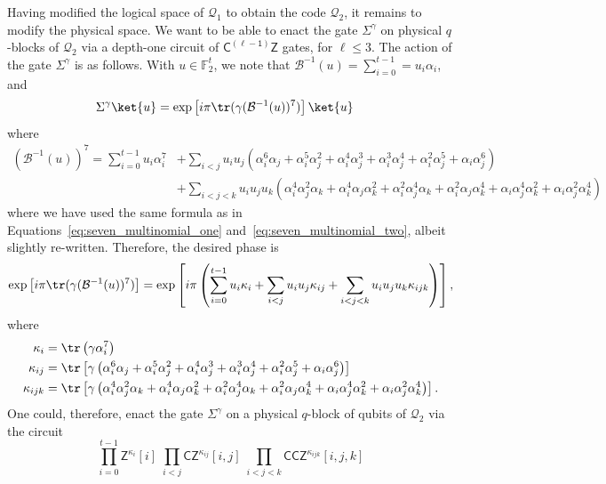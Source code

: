 \documentclass[11pt]{article}
\theoremstyle{definition}
\renewcommand{\leq}{\leqslant}
\newcommand{\CCZ}{\mathsf{CCZ}}
\newcommand{\CLZ}{\mathsf{C^{(\ell-1)}Z}}
\newcommand{\qcode}{\mathcal{Q}}
\begin{document}
Having modified the logical space of $\qcode_1$ to obtain the code $\qcode_2$, it remains to modify the physical space. We want to be able to enact the gate $\Sigma^\gamma$ on physical $q$-blocks of $\qcode_2$ via a depth-one circuit of $\CLZ$ gates, for $\ell \leq 3$. The action of the gate $\Sigma^\gamma$ is as follows. With $u \in \mathbb{F}_2^t$, we note that $\mathcal{B}^{-1}(u) = \sum_{i=0}^{t-1} = u_i\alpha_i$, and
\begin{align}
    \Sigma^\gamma\ket{u} &= \exp\left[i\pi\tr(\gamma(\mathcal{B}^{-1}(u))^7)\right]\ket{u}
\end{align}
where
\begin{align}
    \left(\mathcal{B}^{-1}(u)\right)^7 = \sum_{i=0}^{t-1}u_i\alpha_i^7 &+ \sum_{i < j}u_iu_j\left(\alpha_i^6\alpha_j + \alpha_i^5\alpha_j^2+\alpha_i^4\alpha_j^3+\alpha_i^3\alpha_j^4+\alpha_i^2\alpha_j^5+\alpha_i\alpha_j^6\right)\\
    &+\sum_{i<j<k}u_iu_ju_k\left(\alpha_i^4\alpha_j^2\alpha_k+\alpha_i^4\alpha_j\alpha_k^2+\alpha_i^2\alpha_j^4\alpha_k+\alpha_i^2\alpha_j\alpha_k^4+\alpha_i\alpha_j^4\alpha_k^2+\alpha_i\alpha_j^2\alpha_k^4\right)
\end{align}
where we have used the same formula as in Equations~\eqref{eq:seven_multinomial_one} and~\eqref{eq:seven_multinomial_two}, albeit slightly re-written. Therefore, the desired phase is
\begin{equation}
    \exp\left[i\pi\tr(\gamma(\mathcal{B}^{-1}(u))^7)\right] = \exp\left[i\pi\left(\sum_{i=0}^{t-1}u_i\kappa_i+\sum_{i<j}u_iu_j\kappa_{ij}+\sum_{i<j<k}u_iu_ju_k\kappa_{ijk}\right)\right],
\end{equation}
where
\begin{align}
    \kappa_i &= \tr\left(\gamma\alpha_i^7\right)\\
    \kappa_{ij} &= \tr\left[\gamma\left(\alpha_i^6\alpha_j+\alpha_i^5\alpha_j^2+\alpha_i^4\alpha_j^3+\alpha_i^3\alpha_j^4+\alpha_i^2\alpha_j^5+\alpha_i\alpha_j^6\right)\right]\\
    \kappa_{ijk} &= \tr\left[\gamma\left(\alpha_i^4\alpha_j^2\alpha_k+\alpha_i^4\alpha_j\alpha_k^2+\alpha_i^2\alpha_j^4\alpha_k+\alpha_i^2\alpha_j\alpha_k^4+\alpha_i\alpha_j^4\alpha_k^2+\alpha_i\alpha_j^2\alpha_k^4\right)\right].
\end{align}
One could, therefore, enact the gate $\Sigma^\gamma$ on a physical $q$-block of qubits of $\qcode_2$ via the circuit
\begin{equation}\label{eq:designed_implementation_circuit}
    \prod_{i=0}^{t-1}\mathsf{Z}^{\kappa_i}[i]\;\prod_{i<j}\mathsf{CZ}^{\kappa_{ij}}[i,j]\;\prod_{i<j<k}\CCZ^{\kappa_{ijk}}[i,j,k]
\end{equation}
\end{document}
